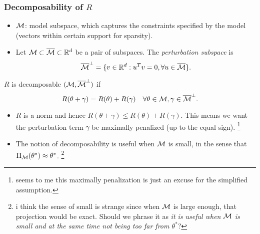 \subsubsection{Decomposability of $R$}

\begin{itemize}
    \item $\mathcal{M}$: model subspace,
        which captures the constraints specified by the model
        (\eg vectors within certain support for sparsity).
    \item Let $\mathcal{M} \subset {\overline{\mathcal{M}}} \subset {\mathbb{R}}^d$ be a pair of subspaces.
        The \emph{perturbation subspace} is
        \begin{equation}
            {\overline{\mathcal{M}}}^\perp = \{v\in{\mathbb{R}}^d: u^Tv=0, \forall u\in{\overline{\mathcal{M}}}\}.
        \end{equation}
\end{itemize}

\begin{define}
    $R$ is decomposable \wrt $(\mathcal{M}, {\overline{\mathcal{M}}}^\perp)$ if
    \begin{equation}
        R(\theta+\gamma) = R(\theta) + R(\gamma) \quad
        \forall \theta \in \mathcal{M}, \gamma \in {\overline{\mathcal{M}}}^\perp.
    \end{equation}
\end{define}

\begin{obs} \leavevmode
\begin{itemize}
    \item $R$ is a norm and hence
        $R(\theta+\gamma)\le R(\theta) + R(\gamma)$.
        This means we want the perturbation term $\gamma$ be
        maximally penalized (up to the equal sign).
        \footnote{seems to me this maximally penalization is just an excuse for
        the simplified assumption.}
    \item The notion of decomposability is useful when $\mathcal{M}$ is small,
        in the sense that $\Pi_{\mathcal{M}}(\theta^*)\approx\theta^*$.
        \footnote{i think the sense of small is strange since when
        $\mathcal{M}$ is large enough, that projection would be exact.
        Should we phrase it as
        \emph{it is useful when $\mathcal{M}$ is small and
        at the same time not being too far from $\theta^*$}?}
\end{itemize}
\end{obs}

